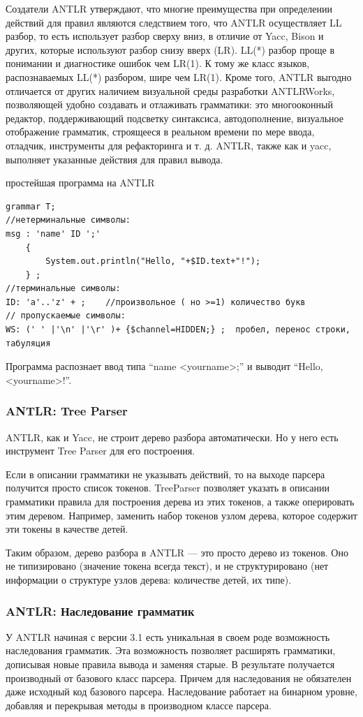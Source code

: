 \documentclass[a4paper,12pt,titlepage]{extarticle}
\begin{document}
Создатели ANTLR утверждают, что многие преимущества при определении действий
для правил являются следствием того, что ANTLR осуществляет LL разбор, то есть
использует разбор сверху вниз, в отличие от Yacc, Bison и других, которые
используют разбор снизу вверх (LR). LL(*) разбор проще в понимании и
диагностике ошибок чем LR(1). К тому же класс языков, распознаваемых LL(*)
разбором, шире чем LR(1). Кроме того, ANTLR выгодно отличается от других
наличием визуальной среды разработки ANTLRWorks, позволяющей удобно создавать и
отлаживать грамматики: это многооконный редактор, поддерживающий подсветку
синтаксиса, автодополнение, визуальное отображение грамматик, строящееся в
реальном времени по мере ввода, отладчик, инструменты для рефакторинга и т. д.
ANTLR, также как и yacc, выполняет указанные действия для правил вывода.

простейшая программа на ANTLR
\begin{verbatim}
grammar T;
//нетерминальные символы:
msg : 'name' ID ';' 
	{
		System.out.println("Hello, "+$ID.text+"!");
	} ;
//терминальные символы:
ID: 'a'..'z' + ;	//произвольное ( но >=1) количество букв
// пропускаемые символы:
WS: (' ' |'\n' |'\r' )+ {$channel=HIDDEN;} ;  пробел, перенос строки, табуляция
\end{verbatim}
Программа распознает ввод типа ``name <yourname>;'' и выводит ``Hello,
<yourname>!''.

\subsubsection*{ANTLR: Tree Parser}
ANTLR, как и Yacc, не строит дерево разбора автоматически. Но у него есть
инструмент Tree Parser для его построения.

Если в описании грамматики не указывать действий, то на выходе парсера получится
просто список токенов. TreeParser позволяет указать в описании грамматики
правила для построения дерева из этих токенов, а также оперировать этим деревом.
Например, заменить набор токенов узлом дерева, которое содержит эти токены в
качестве детей.

Таким образом, дерево разбора в ANTLR --- это просто дерево из токенов. Оно не
типизировано (значение токена всегда текст), и не структурировано (нет
информации о структуре узлов дерева: количестве детей, их типе).

\subsubsection*{ANTLR: Наследование грамматик}
У ANTLR начиная с версии 3.1 есть уникальная в своем роде
возможность наследования грамматик. Эта возможность позволяет расширять
грамматики, дописывая новые правила вывода и заменяя старые. В результате
получается производный от базового класс парсера. Причем для наследования не
обязателен даже исходный код базового парсера. Наследование работает на
бинарном уровне, добавляя и перекрывая методы в производном классе парсера.
\end{document}
